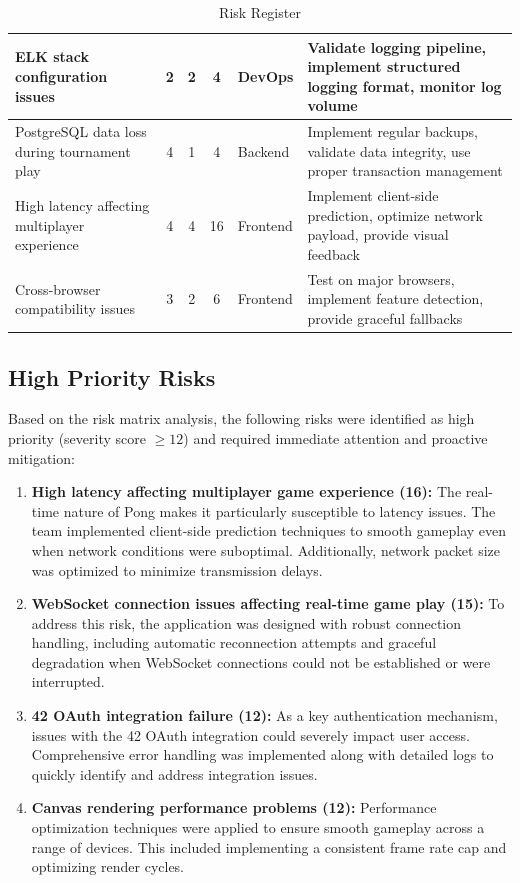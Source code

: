 \begin{table}[H]
\begin{tabular}{|p{3.2cm}|c|c|c|p{1.5cm}|p{5cm}|}
    \hline
    ELK stack configuration issues & 2 & 2 & 4 & DevOps & Validate logging pipeline, implement structured logging format, monitor log volume \\
    \hline
    PostgreSQL data loss during tournament play & 4 & 1 & 4 & Backend & Implement regular backups, validate data integrity, use proper transaction management \\
    \hline
    High latency affecting multiplayer experience & 4 & 4 & 16 & Frontend & Implement client-side prediction, optimize network payload, provide visual feedback \\
    \hline
    Cross-browser compatibility issues & 3 & 2 & 6 & Frontend & Test on major browsers, implement feature detection, provide graceful fallbacks \\
    \hline
    \end{tabular}
    \caption{Risk Register}
    \label{tab:risk_register}
\end{table}

\subsection{High Priority Risks}
Based on the risk matrix analysis, the following risks were identified as high priority (severity score $\geq 12$) and required immediate attention and proactive mitigation:

\begin{enumerate}
    \item \textbf{High latency affecting multiplayer game experience (16):} The real-time nature of Pong makes it particularly susceptible to latency issues. The team implemented client-side prediction techniques to smooth gameplay even when network conditions were suboptimal. Additionally, network packet size was optimized to minimize transmission delays.
    
    \item \textbf{WebSocket connection issues affecting real-time game play (15):} To address this risk, the application was designed with robust connection handling, including automatic reconnection attempts and graceful degradation when WebSocket connections could not be established or were interrupted.
    
    \item \textbf{42 OAuth integration failure (12):} As a key authentication mechanism, issues with the 42 OAuth integration could severely impact user access. Comprehensive error handling was implemented along with detailed logs to quickly identify and address integration issues.
    
    \item \textbf{Canvas rendering performance problems (12):} Performance optimization techniques were applied to ensure smooth gameplay across a range of devices. This included implementing a consistent frame rate cap and optimizing render cycles.
\end{enumerate}

